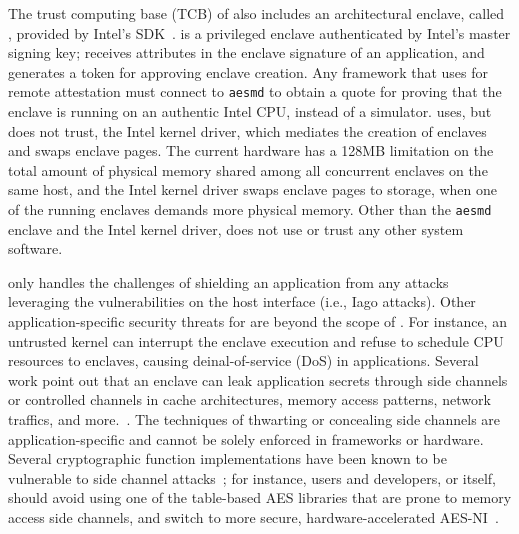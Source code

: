 The trust computing base (TCB) of \graphenesgx{} also includes
an architectural enclave,
called , provided by Intel's \sgx{} SDK~\cite{intel-sgx-linux-sdk}.
 is a privileged enclave
authenticated by Intel's master signing key;
 receives attributes in the enclave signature of an application,
and generates a token for approving enclave creation.
Any framework that uses \sgx{} for remote attestation must connect to {\tt aesmd}
to obtain a quote for proving that the enclave is running on an authentic Intel CPU, instead of a simulator. 
\graphenesgx{} uses, but does not trust, the Intel \sgx{} kernel driver, which mediates the creation of enclaves and swaps enclave pages.
The current \sgx{} hardware
has a 128MB limitation on the total amount of physical memory shared among all concurrent enclaves on the same host,
and the Intel \sgx{} kernel driver swaps enclave pages to storage,
when one of the running enclaves demands more
physical memory.
Other than the {\tt aesmd} enclave and the Intel \sgx{} kernel driver, \graphenesgx{} does not use or trust any other system software.



\graphenesgx{} only handles the challenges of shielding an application from any attacks leveraging the vulnerabilities on the host interface (i.e., Iago attacks).
Other application-specific security threats
for \sgx{} are beyond the scope of \graphenesgx{}.
For instance, an untrusted kernel
can interrupt the enclave execution and refuse to schedule CPU resources to enclaves,
causing deinal-of-service (DoS) in applications.
Several work point out that
an enclave can leak application secrets through
side channels or controlled channels
in cache architectures, memory access patterns, network traffics, and more.~\cite{xu15controlledchannel,atc17side-channel,chen17side-channel,gotzfried17cache-attack,moghimi17cachezoom,xiao17stacco,wang17side-channel}.
The techniques of thwarting or concealing side channels are application-specific and cannot be solely enforced in \sgx{} frameworks or hardware.
Several cryptographic function implementations
have been known to be vulnerable to side channel attacks~\cite{zhou2005side-channels,yarom2017cachebleed};
for instance, users and developers, or \graphenesgx{} itself, should avoid using one of the table-based AES libraries that are prone to memory access side channels,
and switch to more secure,
hardware-accelerated AES-NI~\cite{hofemeier2012aesni}.


